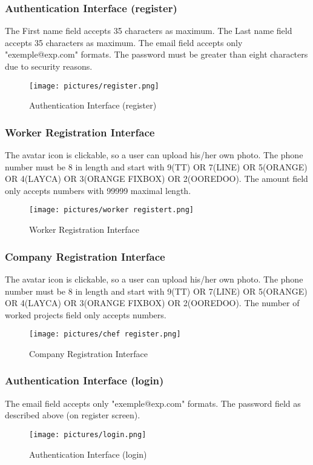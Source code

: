 \documentclass[12pt]{report}
\begin{document}
\pagebreak
\subsubsection{Authentication Interface (register)}
The First name field accepts 35 characters as maximum.
The Last name field accepts 35 characters as maximum.
The email field accepts only "exemple@exp.com" formats.
The password must be greater than eight characters due to security reasons.
\begin{figure}[!htbp]

        \centering
    \texttt{[image: pictures/register.png]}
    \caption{Authentication Interface (register)}
    \label{fig:register}
\end{figure}
\pagebreak
\subsubsection{Worker Registration Interface}
The avatar icon is clickable, so a user can upload his/her own photo.
The phone number must be 8 in length and start with 9(TT) OR 7(LINE) OR 5(ORANGE) OR 4(LAYCA) OR 3(ORANGE FIXBOX) OR 2(OOREDOO). 
The amount field only accepts numbers with 99999 maximal length.
\begin{figure}[!htbp]

        \centering
    \texttt{[image: pictures/worker registert.png]}
    \caption{Worker Registration Interface}
    \label{fig:worker_register}
\end{figure}
\pagebreak
\subsubsection{Company Registration Interface}
The avatar icon is clickable, so a user can upload his/her own photo.
The phone number must be 8 in length and start with 9(TT) OR 7(LINE) OR 5(ORANGE) OR 4(LAYCA) OR 3(ORANGE FIXBOX) OR 2(OOREDOO). 
The number of worked projects field only accepts numbers.
\begin{figure}[!htbp]

        \centering
    \texttt{[image: pictures/chef register.png]}
    \caption{Company Registration Interface}
    \label{fig:chef_register}
\end{figure}
\pagebreak
\subsubsection{Authentication Interface (login)}
The email field accepts only "exemple@exp.com" formats.
The password field as described above (on register screen).
\begin{figure}[!htbp]

        \centering
    \texttt{[image: pictures/login.png]}
    \caption{Authentication Interface (login)}
    \label{fig:login}
\end{figure}
\pagebreak
\end{document}
